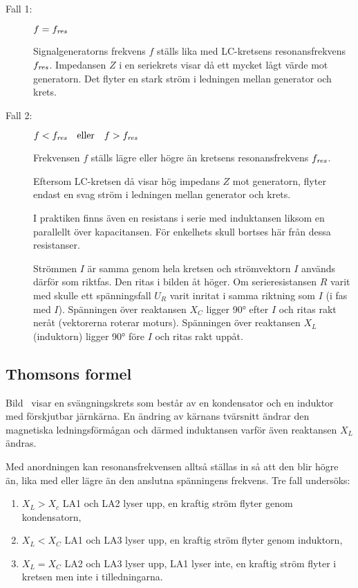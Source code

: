\begin{description}
\item[Fall 1:] \(f = f_{\it res}\)

Signalgeneratorns frekvens \(f\) ställs lika med LC-kretsens resonansfrekvens
\(f_{\it res}\).
Impedansen \(Z\) i en seriekrets visar då ett mycket lågt värde mot generatorn.
Det flyter en stark ström i ledningen mellan generator och krets.

\item[Fall 2:] \(f < f_{\it res} \quad \text{eller} \quad f > f_{\it res}\)

Frekvensen \(f\) ställs lägre eller högre än kretsens resonansfrekvens
\(f_{\it res}\).

Eftersom LC-kretsen då visar hög impedans \(Z\) mot generatorn, flyter
endast en svag ström i ledningen mellan generator och krets.

I praktiken finns även en resistans i serie med induktansen liksom en
parallellt över kapacitansen.
För enkelhets skull bortses här från dessa resistanser.

Strömmen \(I\) är samma genom hela kretsen och strömvektorn \(I\) används
därför som riktfas.
Den ritas i bilden åt höger.
Om serieresistansen \(R\) varit med skulle ett spänningsfall \(U_R\) varit
inritat i samma riktning som \(I\) (i fas med \(I\)).
Spänningen över reaktansen \(X_C\) ligger \ang{90} efter \(I\) och ritas
rakt neråt (vektorerna roterar moturs).
Spänningen över reaktansen \(X_L\) (induktorn) ligger \ang{90} före \(I\) och
ritas rakt uppåt.
\end{description}

\subsection{Thomsons formel}


Bild~ visar en svängningskrets som består av en
kondensator och en induktor med förskjutbar järnkärna.
En ändring av kärnans tvärsnitt ändrar den magnetiska ledningsförmågan och
därmed induktansen varför även reaktansen \(X_L\) ändras.

Med anordningen kan resonansfrekvensen alltså ställas in så att den blir högre än,
lika med eller lägre än den anslutna spänningens frekvens.
Tre fall undersöks:
\begin{enumerate}
\item \(X_L > X_c\) LA1 och LA2 lyser upp, en kraftig ström flyter genom
  kondensatorn,
\item \(X_L < X_C\) LA1 och LA3 lyser upp, en kraftig ström flyter genom
  induktorn,
\item \(X_L= X_C\) LA2 och LA3 lyser upp, LA1 lyser inte, en kraftig ström
  flyter i kretsen men inte i tilledningarna.

\end{enumerate}

